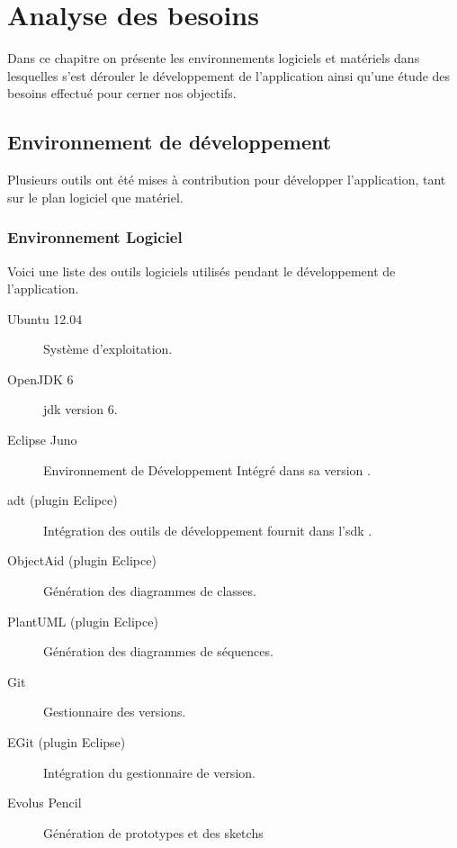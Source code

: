 
\chapter{Analyse des besoins}


Dans ce chapitre on présente les environnements logiciels et matériels dans lesquelles s'est dérouler le développement de l'application ainsi qu'une étude des besoins effectué pour cerner nos objectifs.

\section{Environnement de développement}%

Plusieurs outils ont été mises à contribution pour développer l'application, tant sur le plan logiciel que matériel.

\subsection{Environnement Logiciel}
Voici une liste des outils logiciels utilisés pendant le développement de l'application.

\begin{description}

\item [Ubuntu 12.04] Système d'exploitation.\footnotemark[1]

\item [OpenJDK 6] \gls{jdk} version 6.\footnotemark[2]

\item [Eclipse Juno] Environnement de Développement Intégré dans sa version .\footnotemark[3]

\item [\gls{adt} (plugin Eclipce)] Intégration des outils de développement fournit dans l'\gls{sdk} \android{}.\footnotemark[4]

\item [ObjectAid (plugin Eclipce)] Génération des diagrammes de classes.\footnotemark[5]

\item [PlantUML (plugin Eclipce)] Génération des diagrammes de séquences.\footnotemark[6]

\item [Git] Gestionnaire des versions\footnotemark[7].

\item [EGit (plugin Eclipse)] Intégration du gestionnaire de version.\footnotemark[8]

\item [Evolus Pencil] Génération de prototypes et des sketchs\footnotemark[9]
\end{description}

